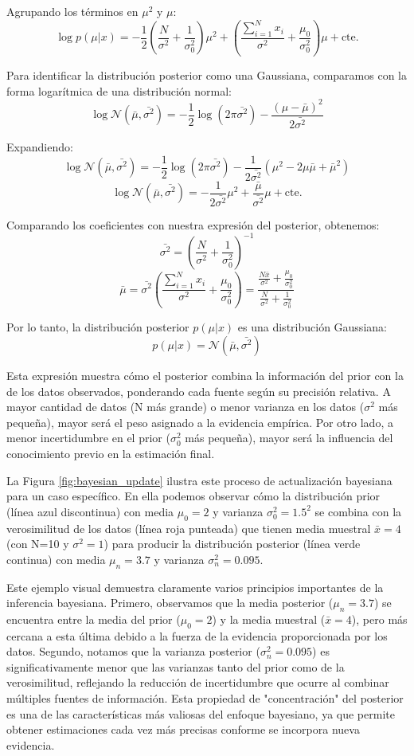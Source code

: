 Agrupando los términos en \(\mu^2\) y \(\mu\):
\[\log p(\mu|x)=-\frac{1}{2}\left(\frac{N}{\sigma^2}+\frac{1}{\sigma_{0}^2}\right)\mu^2+\left(\frac{\sum_{i=1}^{N}x_i}{\sigma^2}+\frac{\mu_0}{\sigma_0^2}\right)\mu+\text{cte.}\]

Para identificar la distribución posterior como una Gaussiana, comparamos con la forma logarítmica de una distribución normal:
\[\log \mathcal{N}(\bar{\mu},\bar{\sigma^2}) = -\frac{1}{2}\log(2\pi\bar{\sigma^2}) - \frac{(\mu-\bar{\mu})^2}{2\bar{\sigma^2}}\]

Expandiendo:
\[\log \mathcal{N}(\bar{\mu},\bar{\sigma^2}) = -\frac{1}{2}\log(2\pi\bar{\sigma^2}) - \frac{1}{2\bar{\sigma^2}}(\mu^2 - 2\mu\bar{\mu} + \bar{\mu}^2)\]
\[\log \mathcal{N}(\bar{\mu},\bar{\sigma^2}) = -\frac{1}{2\bar{\sigma^2}}\mu^2 + \frac{\bar{\mu}}{\bar{\sigma^2}}\mu + \text{cte.}\]

Comparando los coeficientes con nuestra expresión del posterior, obtenemos:
\[\bar{\sigma^2} = \left(\frac{N}{\sigma^2} + \frac{1}{\sigma_0^2}\right)^{-1}\]
\[\bar{\mu} = \bar{\sigma^2}\left(\frac{\sum_{i=1}^{N}x_i}{\sigma^2} + \frac{\mu_0}{\sigma_0^2}\right) = \frac{\frac{N\bar{x}}{\sigma^2} + \frac{\mu_0}{\sigma_0^2}}{\frac{N}{\sigma^2} + \frac{1}{\sigma_0^2}}\]

Por lo tanto, la distribución posterior \(p(\mu|x)\) es una distribución Gaussiana:
\[p(\mu|x) = \mathcal{N}(\bar{\mu}, \bar{\sigma^2})\]

Esta expresión muestra cómo el posterior combina la información del prior con la de los datos observados, ponderando cada fuente según su precisión relativa. A mayor cantidad de datos (N más grande) o menor varianza en los datos ($\sigma^2$ más pequeña), mayor será el peso asignado a la evidencia empírica. Por otro lado, a menor incertidumbre en el prior ($\sigma_0^2$ más pequeña), mayor será la influencia del conocimiento previo en la estimación final.

La Figura \ref{fig:bayesian_update} ilustra este proceso de actualización bayesiana para un caso específico. En ella podemos observar cómo la distribución prior (línea azul discontinua) con media $\mu_0=2$ y varianza $\sigma_0^2=1.5^2$ se combina con la verosimilitud de los datos (línea roja punteada) que tienen media muestral $\bar{x}=4$ (con N=10 y $\sigma^2=1$) para producir la distribución posterior (línea verde continua) con media $\mu_n=3.7$ y varianza $\sigma_n^2=0.095$.

Este ejemplo visual demuestra claramente varios principios importantes de la inferencia bayesiana. Primero, observamos que la media posterior ($\mu_n=3.7$) se encuentra entre la media del prior ($\mu_0=2$) y la media muestral ($\bar{x}=4$), pero más cercana a esta última debido a la fuerza de la evidencia proporcionada por los datos. Segundo, notamos que la varianza posterior ($\sigma_n^2=0.095$) es significativamente menor que las varianzas tanto del prior como de la verosimilitud, reflejando la reducción de incertidumbre que ocurre al combinar múltiples fuentes de información. Esta propiedad de "concentración" del posterior es una de las características más valiosas del enfoque bayesiano, ya que permite obtener estimaciones cada vez más precisas conforme se incorpora nueva evidencia.
